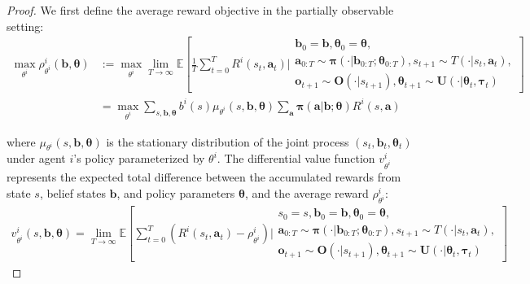 \documentclass[a4paper,12pt]{report}
\begin{document}
\begin{proof}
    We first define the average reward objective in the partially observable setting:
    \begin{align}
        \max_{\theta^i}\rho^{i}_{\theta^i}(\boldsymbol{b}, \boldsymbol{\theta}) & := \max_{\theta^i}\lim_{T \to \infty}\mathbb{E}\left[ \frac{1}{T}\sum_{t=0}^{T} R^{i}(s_{t}, \boldsymbol{a}_{t}) \bigg| \begin{array}{c}\boldsymbol{b}_0= \boldsymbol{b}, \boldsymbol{\theta}_0= \boldsymbol{\theta}, \\ \boldsymbol{a}_{0:T} \sim \boldsymbol{\pi}(\cdot|\boldsymbol{b}_{0:T}; \boldsymbol{\theta}_{0:T}), s_{t+1} \sim T(\cdot|s_t, \boldsymbol{a}_t), \\ \boldsymbol{o}_{t+1} \sim \boldsymbol{O}(\cdot|s_{t+1}), \boldsymbol{\theta}_{t+1} \sim \boldsymbol{U}(\cdot|\boldsymbol{\theta}_t, \boldsymbol{\tau}_t)\end{array} \right] \\
                                                                                & = \max_{\theta^i}\sum_{s, \boldsymbol{b}, \boldsymbol{\theta}}b^{i}(s) \mu_{\theta^i}(s, \boldsymbol{b}, \boldsymbol{\theta}) \sum_{\boldsymbol{a}}\boldsymbol{\pi}(\boldsymbol{a}|\boldsymbol{b}; \boldsymbol{\theta}) R^{i}(s, \boldsymbol{a})
    \end{align}

    where $\mu_{\theta^i}(s, \boldsymbol{b}, \boldsymbol{\theta})$ is the stationary
    distribution of the joint process $(s_{t}, \boldsymbol{b}_{t}, \boldsymbol{\theta}
        _{t})$ under agent $i$'s policy parameterized by $\theta^{i}$. The
    differential value function $v^{i}_{\theta^i}$ represents the expected total
    difference between the accumulated rewards from state $s$, belief states $\boldsymbol
        {b}$, and policy parameters $\boldsymbol{\theta}$, and the average reward $\rho
        ^{i}_{\theta^i}$:
    \begin{align}
        v^{i}_{\theta^i}(s, \boldsymbol{b}, \boldsymbol{\theta}) = \lim_{T \to \infty}\mathbb{E}\left[ \sum_{t=0}^{T} \left(R^{i}(s_{t}, \boldsymbol{a}_{t}) - \rho^{i}_{\theta^i}\right) \bigg| \begin{array}{c}s_0=s, \boldsymbol{b}_0= \boldsymbol{b}, \boldsymbol{\theta}_0= \boldsymbol{\theta}, \\ \boldsymbol{a}_{0:T} \sim \boldsymbol{\pi}(\cdot|\boldsymbol{b}_{0:T}; \boldsymbol{\theta}_{0:T}), s_{t+1} \sim T(\cdot|s_t, \boldsymbol{a}_t), \\ \boldsymbol{o}_{t+1} \sim \boldsymbol{O}(\cdot|s_{t+1}), \boldsymbol{\theta}_{t+1} \sim \boldsymbol{U}(\cdot|\boldsymbol{\theta}_t, \boldsymbol{\tau}_t)\end{array} \right]
    \end{align}


\end{proof}
\end{document}
